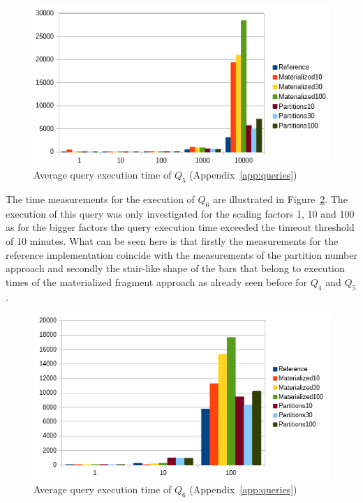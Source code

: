 \begin{figure}[h]
    \centering
    \includegraphics[scale=0.8]{charts/Query5.png}
    \caption{Average query execution time of $Q_5$ (Appendix~\ref{app:queries})}
    \label{fig:query5}
\end{figure}



The time measurements for the execution of $Q_6$ are illustrated in Figure~\ref{fig:query6}. The execution of this query was only investigated for the scaling 
factors 1, 10 and 100 as for the bigger factors the query execution time exceeded the timeout threshold of 10 minutes. What can be seen here is that firstly the 
measurements for the reference implementation coincide with the measurements of the partition number approach and secondly the stair-like shape of the bars that
belong to execution times of the materialized fragment approach as already seen before for $Q_4$ and $Q_5$.

\begin{figure}[h]
    \centering
    \includegraphics[scale=0.8]{charts/Query6.png}
    \caption{Average query execution time of $Q_6$ (Appendix~\ref{app:queries})}
    \label{fig:query6}
\end{figure}


